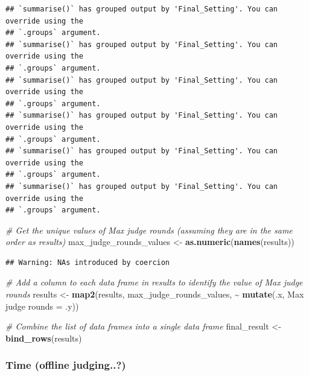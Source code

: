 \documentclass[
]{article}
\newenvironment{Shaded}{\begin{snugshade}}{\end{snugshade}}
\newcommand{\AttributeTok}[1]{\textcolor[rgb]{0.13,0.29,0.53}{#1}}
\newcommand{\CommentTok}[1]{\textcolor[rgb]{0.56,0.35,0.01}{\textit{#1}}}
\newcommand{\FunctionTok}[1]{\textcolor[rgb]{0.13,0.29,0.53}{\textbf{#1}}}
\newcommand{\NormalTok}[1]{#1}
\newcommand{\OtherTok}[1]{\textcolor[rgb]{0.56,0.35,0.01}{#1}}
\newcommand{\SpecialCharTok}[1]{\textcolor[rgb]{0.81,0.36,0.00}{\textbf{#1}}}
\newcommand{\StringTok}[1]{\textcolor[rgb]{0.31,0.60,0.02}{#1}}
\begin{document}
\begin{verbatim}
## `summarise()` has grouped output by 'Final_Setting'. You can override using the
## `.groups` argument.
## `summarise()` has grouped output by 'Final_Setting'. You can override using the
## `.groups` argument.
## `summarise()` has grouped output by 'Final_Setting'. You can override using the
## `.groups` argument.
## `summarise()` has grouped output by 'Final_Setting'. You can override using the
## `.groups` argument.
## `summarise()` has grouped output by 'Final_Setting'. You can override using the
## `.groups` argument.
## `summarise()` has grouped output by 'Final_Setting'. You can override using the
## `.groups` argument.
\end{verbatim}

\begin{Shaded}
\begin{Highlighting}[]
\CommentTok{\# Get the unique values of \textquotesingle{}Max judge rounds\textquotesingle{} (assuming they are in the same order as \textquotesingle{}results\textquotesingle{})}
\NormalTok{max\_judge\_rounds\_values }\OtherTok{\textless{}{-}} \FunctionTok{as.numeric}\NormalTok{(}\FunctionTok{names}\NormalTok{(results))}
\end{Highlighting}
\end{Shaded}

\begin{verbatim}
## Warning: NAs introduced by coercion
\end{verbatim}

\begin{Shaded}
\begin{Highlighting}[]
\CommentTok{\# Add a column to each data frame in \textquotesingle{}results\textquotesingle{} to identify the value of \textquotesingle{}Max judge rounds\textquotesingle{}}
\NormalTok{results }\OtherTok{\textless{}{-}} \FunctionTok{map2}\NormalTok{(results, max\_judge\_rounds\_values, }\SpecialCharTok{\textasciitilde{}} \FunctionTok{mutate}\NormalTok{(.x, }\StringTok{\textasciigrave{}}\AttributeTok{Max judge rounds}\StringTok{\textasciigrave{}} \OtherTok{=}\NormalTok{ .y))}

\CommentTok{\# Combine the list of data frames into a single data frame}
\NormalTok{final\_result }\OtherTok{\textless{}{-}} \FunctionTok{bind\_rows}\NormalTok{(results)}
\end{Highlighting}
\end{Shaded}

\subsubsection{Time (offline judging..?)}\label{time-offline-judging..}
\end{document}
